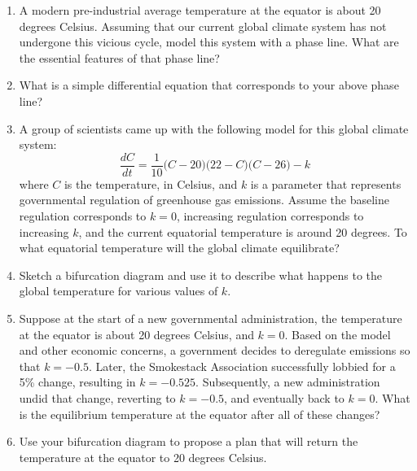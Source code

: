\begin{enumerate}
\begin{enumerate}
\item A modern pre-industrial average temperature at the equator is about 20 degrees Celsius. Assuming that our current global climate system has not undergone this vicious cycle, model this system with a phase line. What are the essential features of that phase line? \label{08problem4parta}
\vfill
\item What is a simple differential equation that corresponds to your above phase line? \label{08problem4partb}
\vfill
\clearpage
\item A group of scientists came up with the following model for this global climate system:
\[
\frac{dC}{dt} = \frac{1}{10}\Big(C-20\Big)\Big(22-C\Big)\Big(C-26\Big)-k
\]
where $C$ is the temperature, in Celsius, and $k$ is a parameter that represents governmental regulation of greenhouse gas emissions. Assume the baseline regulation corresponds to $k=0$, increasing regulation corresponds to increasing $k$, and the current equatorial temperature is around 20 degrees. To what equatorial temperature will the global climate equilibrate? \label{08problem4partc}
\vfill
\item Sketch a bifurcation diagram and use it to describe what happens to the global temperature for various values of $k$. \label{08problem4partd}
\vfill
\clearpage
\item Suppose at the start of a new governmental administration, the temperature at the equator is about 20 degrees Celsius, and $k=0$. Based on the model and other economic concerns, a government decides to deregulate emissions so that $k=-0.5$. Later, the Smokestack Association successfully lobbied for a 5\% change, resulting in $k=-0.525$. Subsequently, a new administration undid that change, reverting to $k=-0.5$, and eventually back to $k=0$. What is the equilibrium temperature at the equator after all of these changes? \label{08problem4parte}
\clearpage
\item Use your bifurcation diagram to propose a plan that will return the temperature at the equator to 20 degrees Celsius. \label{08problem4partf} \vfill

\end{enumerate}

\end{enumerate}
\clearpage
{}

